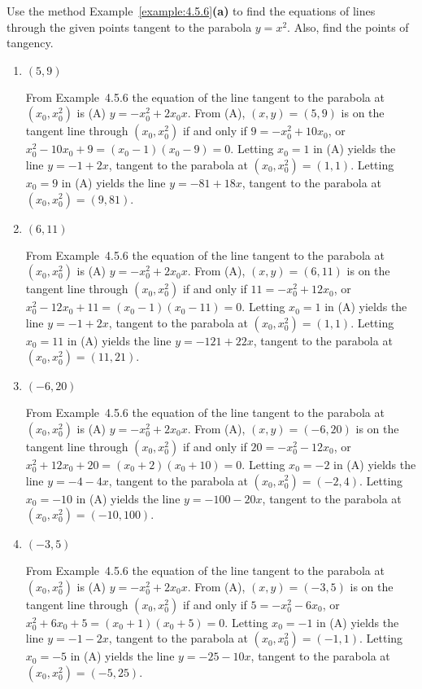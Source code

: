 \documentclass{ximera}
\begin{document}
\begin{problem}\label{exer:4.5.14}
Use the method Example~\ref{example:4.5.6}{\bf (a)} to find the equations
of lines through the given points tangent to the parabola $y=x^2$.
Also, find the points of tangency.
\begin{enumerate}
\item $(5,9)$

\begin{solution}
From Example~4.5.6 the equation of the line tangent to the
parabola at $(x_0,x_0^2)$ is (A) $y=-x_0^2+2x_0x$.  From (A), $(x,y)=(5,9)$ is on the tangent line through
$(x_0,x_0^2)$ if and only if $9=-x_0^2+10x_0$, or
$x_0^2-10x_0+9=(x_0-1)(x_0-9)=0$. Letting $x_0=1$ in (A) yields the
line $y=-1+2x$, tangent to the parabola at $(x_0,x_0^2)=(1,1)$.
Letting $x_0=9$ in (A) yields the line $y=-81+18x$, tangent to the
parabola at $(x_0,x_0^2)=(9,81)$.
\end{solution}
    
\item $(6,11)$

\begin{solution}
From Example~4.5.6 the equation of the line tangent to the
parabola at $(x_0,x_0^2)$ is (A) $y=-x_0^2+2x_0x$.  From (A), $(x,y)=(6,11)$ is on the tangent line through
$(x_0,x_0^2)$ if and only if $11=-x_0^2+12x_0$, or
$x_0^2-12x_0+11=(x_0-1)(x_0-11)=0$. Letting $x_0=1$ in (A) yields the
line $y=-1+2x$, tangent to the parabola at $(x_0,x_0^2)=(1,1)$.
Letting $x_0=11$ in (A) yields the line $y=-121+22x$, tangent to the
parabola at $(x_0,x_0^2)=(11,21)$.
\end{solution}

\item $(-6,20)$

\begin{solution}
From Example~4.5.6 the equation of the line tangent to the
parabola at $(x_0,x_0^2)$ is (A) $y=-x_0^2+2x_0x$.  From (A), $(x,y)=(-6,20)$ is on the tangent line through
$(x_0,x_0^2)$ if and only if $20=-x_0^2-12x_0$, or
$x_0^2+12x_0+20=(x_0+2)(x_0+10)=0$. Letting $x_0=-2$ in (A) yields the
line $y=-4-4x$, tangent to the parabola at $(x_0,x_0^2)=(-2,4)$.
Letting $x_0=-10$ in (A) yields the line $y=-100-20x$, tangent to the
parabola at $(x_0,x_0^2)=(-10,100)$.
\end{solution}
    
\item $(-3,5)$

\begin{solution}
From Example~4.5.6 the equation of the line tangent to the
parabola at $(x_0,x_0^2)$ is (A) $y=-x_0^2+2x_0x$.  From (A), $(x,y)=(-3,5)$ is on the tangent line through
$(x_0,x_0^2)$ if and only if $5=-x_0^2-6x_0$, or
$x_0^2+6x_0+5=(x_0+1)(x_0+5)=0$. Letting $x_0=-1$ in (A) yields the
line $y=-1-2x$, tangent to the parabola at $(x_0,x_0^2)=(-1,1)$.
Letting $x_0=-5$ in (A) yields the line $y=-25-10x$, tangent to the
parabola at $(x_0,x_0^2)=(-5,25)$.
\end{solution}
\end{enumerate}
\end{problem}
\end{document}
